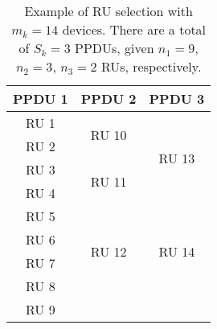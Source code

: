 \begin{table}[]
\centering
\begin{tabular}{|c|c|c|}
\hline 
\textbf{PPDU 1} & \textbf{PPDU 2} & \textbf{PPDU 3}        \\ \hline \hline
\multicolumn{1}{|c|}{RU 1} & \multicolumn{1}{c|}{\multirow{2}{*}{RU 10}} & \multicolumn{1}{c|}{\multirow{4}{*}{RU 13}} \\ \cline{1-1}
\multicolumn{1}{|c|}{RU 2} & \multicolumn{1}{c|}{}                       & \multicolumn{1}{c|}{}                       \\ \cline{1-2}
\multicolumn{1}{|c|}{RU 3} & \multicolumn{1}{c|}{\multirow{2}{*}{RU 11}} & \multicolumn{1}{c|}{}                       \\ \cline{1-1}
\multicolumn{1}{|c|}{RU 4} & \multicolumn{1}{c|}{}                       & \multicolumn{1}{c|}{}                       \\ \hline
\multicolumn{1}{|c|}{RU 5} & \multicolumn{1}{c|}{\multirow{4}{*}{RU 12}} & \multicolumn{1}{c|}{\multirow{4}{*}{RU 14}} \\ \cline{1-1}
\multicolumn{1}{|c|}{RU 6} & \multicolumn{1}{c|}{}                       & \multicolumn{1}{c|}{}                       \\ \cline{1-1}
\multicolumn{1}{|c|}{RU 7} & \multicolumn{1}{c|}{}                       & \multicolumn{1}{c|}{}                       \\ \cline{1-1}
\multicolumn{1}{|c|}{RU 8} & \multicolumn{1}{c|}{}                       & \multicolumn{1}{c|}{}                       \\ \hline
\multicolumn{1}{|c|}{RU 9} & \multicolumn{1}{c|}{}                       & \multicolumn{1}{c|}{}                       \\ \hline
\end{tabular}
\caption{Example of RU selection with $m_k= 14$ devices. There are a total of $S_k = 3$ PPDUs, given $n_1=9$, $n_2 = 3$, $n_3 = 2$ RUs, respectively.}
\label{tab_rus}
\end{table}

